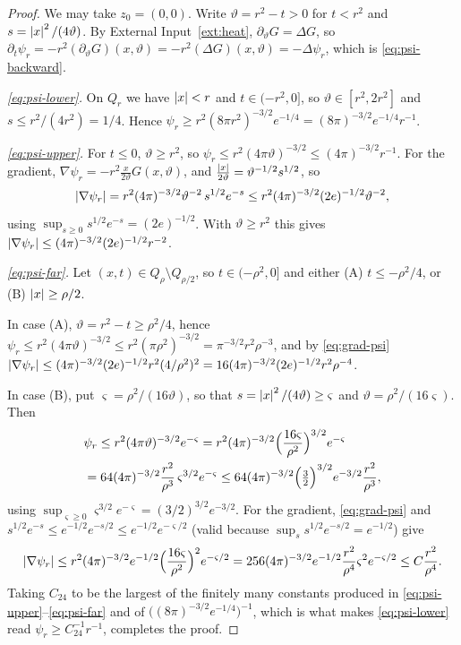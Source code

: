 \documentclass[11pt,reqno]{amsart}
\begin{document}
\begin{proof}
We may take $z_{0}=(0,0)$. Write $\vartheta=r^{2}-t>0$ for $t<r^{2}$ and
$s=\left\lvert x \right\rvert^{2}/(4\vartheta)$. By External Input~\ref{ext:heat},
$\partial_{\vartheta}G=\Delta G$, so
$\partial_{t}\psi_{r}=-r^{2}(\partial_{\vartheta}G)(x,\vartheta)
 =-r^{2}(\Delta G)(x,\vartheta)=-\Delta\psi_{r}$, which is
\eqref{eq:psi-backward}.

\emph{\eqref{eq:psi-lower}.} On $Q_{r}$ we have $\left\lvert x \right\rvert<r$ and
$t\in(-r^{2},0]$, so $\vartheta\in[r^{2},2r^{2}]$ and $s\le r^{2}/(4r^{2})=1/4$.
Hence
$\psi_{r}\ge r^{2}(8\pi r^{2})^{-3/2}e^{-1/4}=(8\pi)^{-3/2}e^{-1/4}r^{-1}$.

\emph{\eqref{eq:psi-upper}.} For $t\le0$, $\vartheta\ge r^{2}$, so
$\psi_{r}\le r^{2}(4\pi\vartheta)^{-3/2}\le(4\pi)^{-3/2}r^{-1}$. For the
gradient, $\nabla\psi_{r}=-r^{2}\frac{x}{2\vartheta}G(x,\vartheta)$, and
$\frac{\left\lvert x \right\rvert}{2\vartheta}=\vartheta^{-1/2}s^{1/2}$, so
\begin{equation}\label{eq:grad-psi}
  \left\lvert \nabla\psi_{r} \right\rvert
  =r^{2}(4\pi)^{-3/2}\vartheta^{-2}\,s^{1/2}e^{-s}
  \le r^{2}(4\pi)^{-3/2}(2e)^{-1/2}\vartheta^{-2},
\end{equation}
using $\sup_{s\ge0}s^{1/2}e^{-s}=(2e)^{-1/2}$. With $\vartheta\ge r^{2}$ this
gives $\left\lvert \nabla\psi_{r} \right\rvert\le(4\pi)^{-3/2}(2e)^{-1/2}r^{-2}$.

\emph{\eqref{eq:psi-far}.} Let $(x,t)\in Q_{\rho}\setminus Q_{\rho/2}$, so
$t\in(-\rho^{2},0]$ and either (A) $t\le-\rho^{2}/4$, or (B)
$\left\lvert x \right\rvert\ge\rho/2$.

In case (A), $\vartheta=r^{2}-t\ge\rho^{2}/4$, hence
$\psi_{r}\le r^{2}(4\pi\vartheta)^{-3/2}\le r^{2}(\pi\rho^{2})^{-3/2}
 =\pi^{-3/2}r^{2}\rho^{-3}$, and by \eqref{eq:grad-psi}
$\left\lvert \nabla\psi_{r} \right\rvert\le(4\pi)^{-3/2}(2e)^{-1/2}r^{2}(4/\rho^{2})^{2}
 =16(4\pi)^{-3/2}(2e)^{-1/2}r^{2}\rho^{-4}$.

In case (B), put $\varsigma=\rho^{2}/(16\vartheta)$, so that
$s=\left\lvert x \right\rvert^{2}/(4\vartheta)\ge\varsigma$ and $\vartheta=\rho^{2}/(16\varsigma)$.
Then
\[\begin{aligned}
  &\psi_{r}\le r^{2}(4\pi\vartheta)^{-3/2}e^{-\varsigma}
  =r^{2}(4\pi)^{-3/2}\Bigl(\frac{16\varsigma}{\rho^{2}}\Bigr)^{3/2}e^{-\varsigma}
  \\ &=64(4\pi)^{-3/2}\frac{r^{2}}{\rho^{3}}\,\varsigma^{3/2}e^{-\varsigma}
  \le64(4\pi)^{-3/2}\Bigl(\tfrac32\Bigr)^{3/2}e^{-3/2}\frac{r^{2}}{\rho^{3}},
\end{aligned}\]
using $\sup_{\varsigma\ge0}\varsigma^{3/2}e^{-\varsigma}=(3/2)^{3/2}e^{-3/2}$.
For the gradient, \eqref{eq:grad-psi} and
$s^{1/2}e^{-s}\le e^{-1/2}e^{-s/2}\le e^{-1/2}e^{-\varsigma/2}$ (valid because
$\sup_{s}s^{1/2}e^{-s/2}=e^{-1/2}$) give
\[
  \left\lvert \nabla\psi_{r} \right\rvert\le r^{2}(4\pi)^{-3/2}e^{-1/2}
    \Bigl(\frac{16\varsigma}{\rho^{2}}\Bigr)^{2}e^{-\varsigma/2}
  =256(4\pi)^{-3/2}e^{-1/2}\frac{r^{2}}{\rho^{4}}\varsigma^{2}e^{-\varsigma/2}
  \le C\frac{r^{2}}{\rho^{4}} .
\]
Taking $C_{24}$ to be the largest of the finitely many constants produced in
\eqref{eq:psi-upper}--\eqref{eq:psi-far} and of
$\bigl((8\pi)^{-3/2}e^{-1/4}\bigr)^{-1}$, which is what makes
\eqref{eq:psi-lower} read $\psi_{r}\ge C_{24}^{-1}r^{-1}$, completes the proof.
\end{proof}
\end{document}
